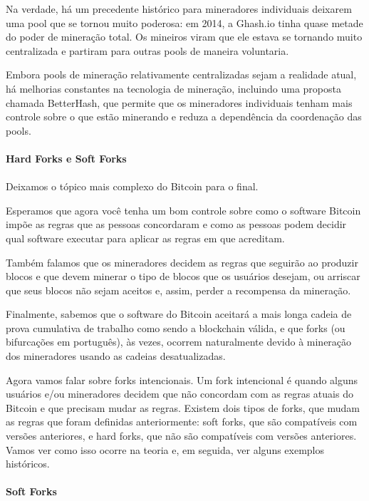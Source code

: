 Na verdade, há um precedente histórico para mineradores individuais deixarem uma pool que se tornou muito poderosa: em 2014, a Ghash.io tinha quase metade do poder de mineração total. Os mineiros viram que ele estava se tornando muito centralizada e partiram para outras pools de maneira voluntaria.

Embora pools de mineração relativamente centralizadas sejam a realidade atual, há melhorias constantes na tecnologia de mineração, incluindo uma proposta chamada BetterHash, que permite que os mineradores individuais tenham mais controle sobre o que estão minerando e reduza a dependência da coordenação das pools.

\paragraph{Hard Forks e Soft Forks}
\paragraph{}

Deixamos o tópico mais complexo do Bitcoin para o final.

Esperamos que agora você tenha um bom controle sobre como o software Bitcoin impõe as regras que as pessoas concordaram e como as pessoas podem decidir qual software executar para aplicar as regras em que acreditam.

Também falamos que os mineradores decidem as regras que seguirão ao produzir blocos e que devem minerar o tipo de blocos que os usuários desejam, ou arriscar que seus blocos não sejam aceitos e, assim, perder a recompensa da mineração.

Finalmente, sabemos que o software do Bitcoin aceitará a mais longa cadeia de prova cumulativa de trabalho como sendo a blockchain válida, e que forks (ou bifurcações em português), às vezes, ocorrem naturalmente devido à mineração dos mineradores usando as cadeias desatualizadas.

Agora vamos falar sobre forks intencionais. Um fork intencional é quando alguns usuários e/ou mineradores decidem que não concordam com as regras atuais do Bitcoin e que precisam mudar as regras. Existem dois tipos de forks, que mudam as regras que foram definidas anteriormente: soft forks, que são compatíveis com versões anteriores, e hard forks, que não são compatíveis com versões anteriores. Vamos ver como isso ocorre na teoria e, em seguida, ver alguns exemplos históricos.

\paragraph{Soft Forks}
